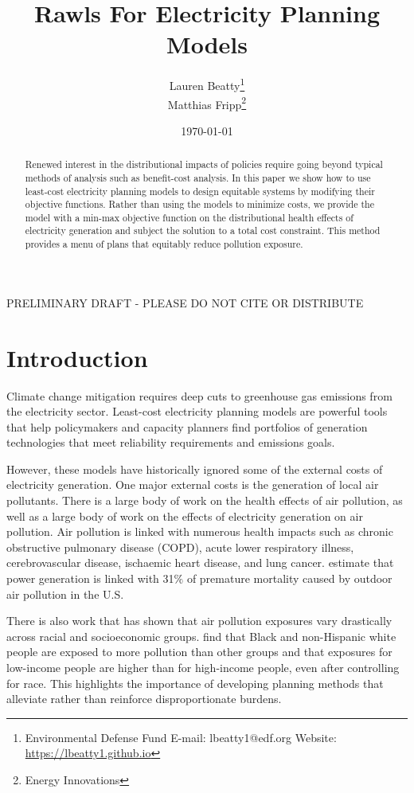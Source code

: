 \documentclass[a4paper]{article}
\title{Rawls For Electricity Planning Models}
\author{Lauren Beatty\thanks{Environmental Defense Fund  \hspace{.5cm} E-mail: lbeatty1@edf.org \hspace{.5cm}Website: \href{https://lbeatty1.github.io}{https://lbeatty1.github.io}}\\
Matthias Fripp\thanks{Energy Innovations}}
\date{\today}
\theoremstyle{definition}
\theoremstyle{plain}
\begin{document}
\maketitle
\begin{center}
    PRELIMINARY DRAFT - PLEASE DO NOT CITE OR DISTRIBUTE
\end{center}

\begin{abstract}
Renewed interest in the distributional impacts of policies require going beyond typical methods of analysis such as benefit-cost analysis.  In this paper we show how to use least-cost electricity planning models to design equitable systems by modifying their objective functions.  Rather than using the models to minimize costs, we provide the model with a min-max objective function on the distributional health effects of electricity generation and subject the solution to a total cost constraint.  This method provides a menu of plans that equitably reduce pollution exposure.
\end{abstract}


\newpage
\section{Introduction}
Climate change mitigation requires deep cuts to greenhouse gas emissions from the electricity sector.  Least-cost electricity planning models are powerful tools that help policymakers and capacity planners find portfolios of generation technologies that meet reliability requirements and emissions goals.  

However, these models have historically ignored some of the external costs of electricity generation. One major external costs is the generation of local air pollutants.  There is a large body of work on the health effects of air pollution, as well as a large body of work on the effects of electricity generation on air pollution. 
Air pollution is linked with numerous health impacts such as chronic obstructive pulmonary disease (COPD), acute lower respiratory illness, cerebrovascular disease, ischaemic heart disease, and lung cancer. \cite{Lelieveld2015TheScale} estimate that power generation is linked with 31$\%$ of premature mortality caused by outdoor air pollution in the U.S.

There is also work that has shown that air pollution exposures vary drastically across racial and socioeconomic groups.   \cite{Thind2019FineGeography} find that Black and non-Hispanic white people are exposed to more pollution than other groups and that exposures for low-income people are higher than for high-income people, even after controlling for race.  This highlights the importance of developing planning methods that alleviate rather than reinforce disproportionate burdens.
\end{document}
